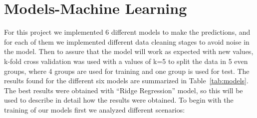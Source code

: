 \documentclass[10pt,conference,compsocconf]{IEEEtran}
\begin{document}
\section{Models-Machine Learning}
For this project we implemented 6 different models to make the predictions, 
and for each of them we implemented different data cleaning stages
to avoid noise in the model. Then to assure that the model will work as 
expected with new values, k-fold cross validation was used with a values of
k=5 to split the data in 5 even groups, where 4 groups are used for training 
and one group is used for test. 
The results found for the different six models are summarized in Table~\ref{tab:models}.
The best results were obtained with ``Ridge Regression'' model, so this will
be used to describe in detail how the results were obtained.
To begin with the training of our models first we analyzed different scenarios: 
\end{document}
